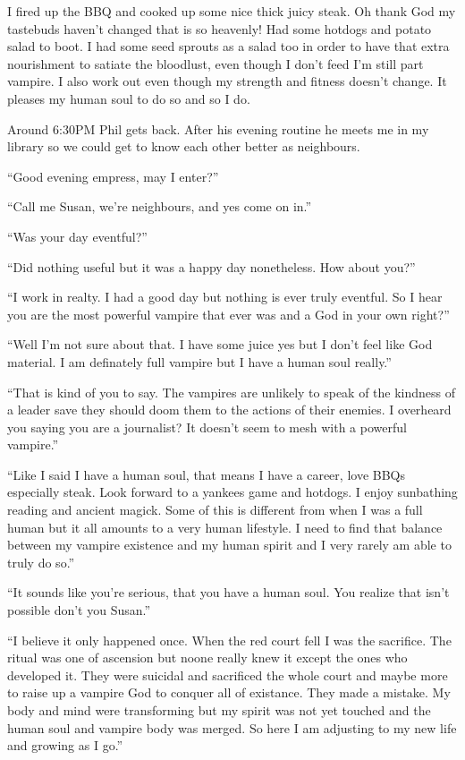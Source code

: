 I fired up the BBQ and cooked up some nice thick juicy steak. Oh thank God my tastebuds haven't changed that is so heavenly! Had some hotdogs and potato salad to boot. I had some seed sprouts as a salad too in order to have that extra nourishment to satiate the bloodlust, even though I don't feed I'm still part vampire. I also work out even though my strength and fitness doesn't change. It pleases my human soul to do so and so I do.

Around 6:30PM Phil gets back. After his evening routine he meets me in my library so we could get to know each other better as neighbours.

``Good evening empress, may I enter?''

``Call me Susan, we're neighbours, and yes come on in.''

``Was your day eventful?''

``Did nothing useful but it was a happy day nonetheless. How about you?''

``I work in realty. I had a good day but nothing is ever truly eventful. So I hear you are the most powerful vampire that ever was and a God in your own right?''

``Well I'm not sure about that. I have some juice yes but I don't feel like God material. I am definately full vampire but I have a human soul really.''

``That is kind of you to say. The vampires are unlikely to speak of the kindness of a leader save they should doom them to the actions of their enemies. I overheard you saying you are a journalist? It doesn't seem to mesh with a powerful vampire.''

``Like I said I have a human soul, that means I have a career, love BBQs especially steak. Look forward to a yankees game and hotdogs. I enjoy sunbathing reading and ancient magick. Some of this is different from when I was a full human but it all amounts to a very human lifestyle. I need to find that balance between my vampire existence and my human spirit and I very rarely am able to truly do so.''

``It sounds like you're serious, that you have a human soul. You realize that isn't possible don't you Susan.''

``I believe it only happened once. When the red court fell I was the sacrifice. The ritual was one of ascension but noone really knew it except the ones who developed it. They were suicidal and sacrificed the whole court and maybe more to raise up a vampire God to conquer all of existance. They made a mistake. My body and mind were transforming but my spirit was not yet touched and the human soul and vampire body was merged. So here I am adjusting to my new life and growing as I go.''

